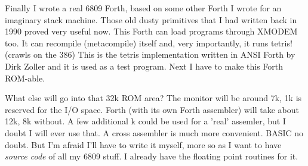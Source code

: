Finally I wrote a real 6809 Forth, based on some other Forth I wrote for an
imaginary stack machine. Those old dusty primitives that I had written back in
1990 proved very useful now. This Forth can load programs through XMODEM
too. It can recompile (metacompile) itself and, very importantly, it runs
tetris! (crawls on the 386) This is the tetris implementation written in
ANSI Forth by Dirk Zoller and it is used as a test program.
Next I have to make this Forth ROM-able.

What else will go into that 32k ROM area? The monitor will be around 7k, 1k
is reserved for the I/O space. Forth (with its own Forth assembler) will
take about 12k, 8k without. A few additional k could be used for a 'real'
assemler, but I doubt I will ever use that. A cross assembler is much more
convenient. BASIC no doubt. But I'm afraid I'll have to write it myself,
more so as I want to have {\em source code} of all my 6809 stuff. I already have
the floating point routines for it.


